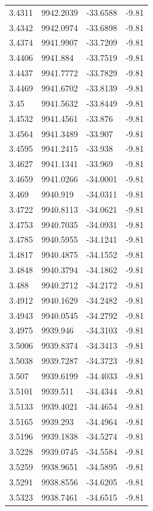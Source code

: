 \begin{table}[H]
\begin{tabular}{llll}
3.4311 & 9942.2039 & -33.6588 & -9.81 \\
3.4342 & 9942.0974 & -33.6898 & -9.81 \\
3.4374 & 9941.9907 & -33.7209 & -9.81 \\
3.4406 & 9941.884 & -33.7519 & -9.81 \\
3.4437 & 9941.7772 & -33.7829 & -9.81 \\
3.4469 & 9941.6702 & -33.8139 & -9.81 \\
3.45 & 9941.5632 & -33.8449 & -9.81 \\
3.4532 & 9941.4561 & -33.876 & -9.81 \\
3.4564 & 9941.3489 & -33.907 & -9.81 \\
3.4595 & 9941.2415 & -33.938 & -9.81 \\
3.4627 & 9941.1341 & -33.969 & -9.81 \\
3.4659 & 9941.0266 & -34.0001 & -9.81 \\
3.469 & 9940.919 & -34.0311 & -9.81 \\
3.4722 & 9940.8113 & -34.0621 & -9.81 \\
3.4753 & 9940.7035 & -34.0931 & -9.81 \\
3.4785 & 9940.5955 & -34.1241 & -9.81 \\
3.4817 & 9940.4875 & -34.1552 & -9.81 \\
3.4848 & 9940.3794 & -34.1862 & -9.81 \\
3.488 & 9940.2712 & -34.2172 & -9.81 \\
3.4912 & 9940.1629 & -34.2482 & -9.81 \\
3.4943 & 9940.0545 & -34.2792 & -9.81 \\
3.4975 & 9939.946 & -34.3103 & -9.81 \\
3.5006 & 9939.8374 & -34.3413 & -9.81 \\
3.5038 & 9939.7287 & -34.3723 & -9.81 \\
3.507 & 9939.6199 & -34.4033 & -9.81 \\
3.5101 & 9939.511 & -34.4344 & -9.81 \\
3.5133 & 9939.4021 & -34.4654 & -9.81 \\
3.5165 & 9939.293 & -34.4964 & -9.81 \\
3.5196 & 9939.1838 & -34.5274 & -9.81 \\
3.5228 & 9939.0745 & -34.5584 & -9.81 \\
3.5259 & 9938.9651 & -34.5895 & -9.81 \\
3.5291 & 9938.8556 & -34.6205 & -9.81 \\
3.5323 & 9938.7461 & -34.6515 & -9.81 \\

\end{tabular}
\end{table}
